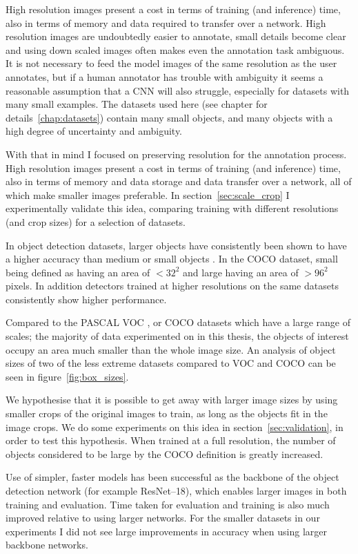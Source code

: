 High resolution images present a cost in terms of training (and inference) time, also in terms of memory and data required to transfer over a network. High resolution images are undoubtedly easier to annotate, small details become clear and using down scaled images often makes even the annotation task ambiguous. It is not necessary to feed the model images of the same resolution as the user annotates, but if a human annotator has trouble with ambiguity it seems a reasonable assumption that a \gls{CNN} will also struggle, especially for datasets with many small examples. The datasets used here (see chapter for details~\ref{chap:datasets}) contain many small objects, and many objects with a high degree of uncertainty and ambiguity.

With that in mind I focused on preserving resolution for the annotation process. High resolution images present a cost in terms of training (and inference) time, also in terms of memory and data storage and data transfer over a network, all of which make smaller images preferable. In section~\ref{sec:scale_crop} I experimentally validate this idea, comparing training with different resolutions (and crop sizes) for a selection of datasets.

In object detection datasets, larger objects have consistently been shown to have a higher accuracy than medium or small objects \cite{Lin2014, Wang2017, Lin2017a, Law2018, Zhou2019}. In the COCO dataset, small being defined as having an area of $<32^2$ and large having an area of $>96^2$ pixels. In addition detectors trained at higher resolutions on the same datasets consistently show higher performance.

 Compared to the PASCAL VOC \cite{Everingham2008}, or COCO \cite{Lin2014} datasets which have a large range of scales; the majority of data experimented on in this thesis, the objects of interest occupy an area much smaller than the whole image size. An analysis of object sizes of two of the less extreme datasets compared to VOC and COCO can be seen in figure~\ref{fig:box_sizes}. 

We hypothesise that it is possible to get away with larger image sizes by using smaller crops of the original images to train, as long as the objects fit in the image crops. We do some experiments on this idea in section~\ref{sec:validation}, in order to test this hypothesis. When trained at a full resolution, the number of objects considered to be large by the COCO definition is greatly increased.

Use of simpler, faster models has been successful as the backbone of the object detection network (for example ResNet--18), which enables larger images in both training and evaluation. Time taken for evaluation and training is also much improved relative to using larger networks. For the smaller datasets in our experiments I did not see large improvements in accuracy when using larger backbone networks.

